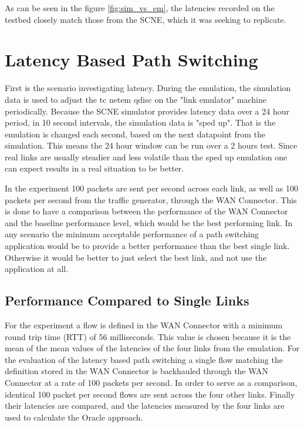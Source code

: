 As can be seen in the figure \ref{fig:sim_vs_em}, the latencies recorded on the testbed closely match those from the SCNE, which it was seeking to replicate.

\section{Latency Based Path Switching}

First is the scenario investigating latency. During the emulation, the simulation data is used to adjust the tc netem qdisc on the "link emulator" machine periodically. Because the SCNE simulator provides latency data over a 24 hour period, in 10 second intervals, the simulation data is "sped up". That is the emulation is changed each second, based on the next datapoint from the simulation. This means the 24 hour window can be run over a 2 hours test. Since real links are usually steadier and less volatile than the sped up emulation one can expect results in a real situation to be better.

In the experiment 100 packets are sent per second across each link, as well as 100 packets per second from the traffic generator, through the WAN Connector. This is done to have a comparison between the performance of the WAN Connector and the baseline performance level, which would be the best performing link. In any scenario the minimum acceptable performance of a path switching application would be to provide a better performance than the best single link. Otherwise it would be better to just select the best link, and not use the application at all.


\subsection{Performance Compared to Single Links}

For the experiment a flow is defined in the WAN Connector with a minimum round trip time (RTT) of 56 milliseconds. This value is chosen because it is the mean of the mean values of the latencies of the four links from the emulation. For the evaluation of the latency based path switching a single flow matching the definition stored in the WAN Connector is backhauled through the WAN Connector at a rate of 100 packets per second. In order to serve as a comparison, identical 100 packet per second flows are sent across the four other links. Finally their latencies are compared, and the latencies measured by the four links are used to calculate the Oracle approach.

